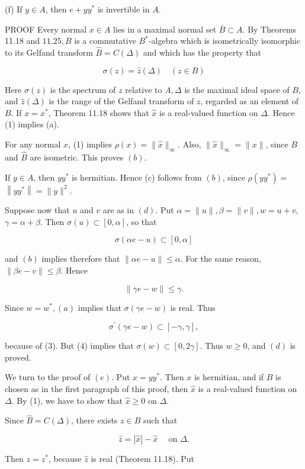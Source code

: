 \documentclass[10pt]{article}
\begin{document}
(f) If $y \in A$, then $e+y y^{*}$ is invertible in $A$.

PROOF Every normal $x \in A$ lies in a maximal normal set $\bar{B} \subset A$. By Theorems 11.18 and $11.25, B$ is a commutative $B^{*}$-algebra which is isometrically isomorphic to its Gelfand transform $\hat{B}=C(\Delta)$ and which has the property that

$$
\sigma(z)=\hat{z}(\Delta) \quad(z \in B)
$$

Here $\sigma(z)$ is the spectrum of $z$ relative to $A, \Delta$ is the maximal ideal space of $B$, and $\hat{z}(\Delta)$ is the range of the Gelfand transform of $z$, regarded as an element of $B$. If $x=x^{*}$, Theorem 11.18 shows that $\hat{x}$ is a real-valued function on $\Delta$. Hence (1) implies (a).

For any normal $x$, (1) implies $\rho(x)=\|\hat{x}\|_{\infty}$. Also, $\|\hat{x}\|_{\infty}=\|x\|$, since $B$ and $\hat{B}$ are isometric. This proves $(b)$.

If $y \in A$, then $y y^{*}$ is hermitian. Hence (c) follows from $(b)$, since $\rho\left(y y^{*}\right)=$ $\left\|y y^{*}\right\|=\|y\|^{2}$.

Suppose now that $u$ and $v$ are as in $(d)$. Put $\alpha=\|u\|, \beta=\|v\|, w=u+v$, $\gamma=\alpha+\beta$. Then $\sigma(u) \subset[0, \alpha]$, so that

$$
\sigma(\alpha e-u) \subset[0, \alpha]
$$

and $(b)$ implies therefore that $\|\alpha e-u\| \leq \alpha$. For the same reason, $\|\beta e-v\| \leq \beta$. Hence

$$
\|\gamma e-w\| \leq \gamma .
$$

Since $w=w^{*},(a)$ implies that $\sigma(\gamma e-w)$ is real. Thus

$$
\sigma^{\prime}(\gamma e-w) \subset[-\gamma, \gamma],
$$

because of (3). But (4) implies that $\sigma(w) \subset[0,2 \gamma]$. Thus $w \geq 0$, and $(d)$ is proved.

We turn to the proof of $(e)$. Put $x=y y^{*}$. Then $x$ is hermitian, and if $B$ is chosen as in the first paragraph of this proof, then $\hat{x}$ is a real-valued function on $\Delta$. By (1), we have to show that $\hat{x} \geq 0$ on $\Delta$.

Since $\widehat{B}=C(\Delta)$, there exists $z \in B$ such that

$$
\hat{z}=|\hat{x}|-\hat{x} \quad \text { on } \Delta .
$$

Then $z=z^{*}$, because $\hat{z}$ is real (Theorem 11.18). Put
\end{document}
